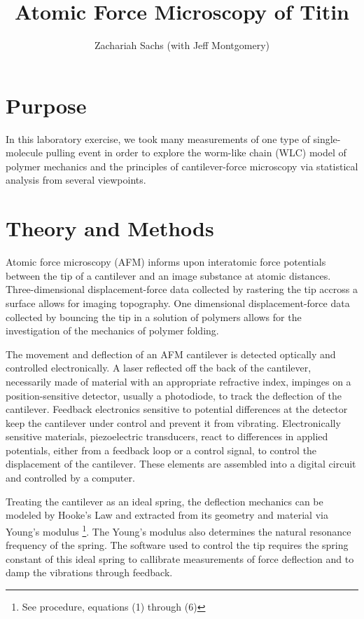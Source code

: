 \documentclass{article}
\title{Atomic Force Microscopy of Titin}
\author{Zachariah Sachs (with Jeff Montgomery)}
\begin{document}
\maketitle
\section{Purpose}

In this laboratory exercise, we took many measurements of one type of
single-molecule pulling event in order to explore the worm-like chain (WLC)
model of polymer mechanics and the principles of cantilever-force microscopy via statistical
analysis from several viewpoints.

\section{Theory and Methods}

Atomic force microscopy (AFM) informs upon interatomic force potentials 
between the tip of a cantilever and an image substance at atomic distances.
Three-dimensional displacement-force data collected by rastering the tip accross a surface
allows for imaging topography. One dimensional displacement-force data collected by 
bouncing the tip in a solution of polymers allows for the investigation of the mechanics
of polymer folding.

The movement and deflection of an AFM cantilever is detected optically and controlled
electronically. A laser reflected off the back of the cantilever,
necessarily made of material with an appropriate refractive index, impinges on a
position-sensitive detector, usually a photodiode, to track the deflection of the cantilever.
Feedback electronics sensitive to potential differences at the detector keep the cantilever
under control and prevent it from vibrating. Electronically sensitive materials, 
piezoelectric transducers, react to differences in applied potentials, either from a feedback
loop or a control signal, to control the displacement of the cantilever. These elements are
assembled into a digital circuit and controlled by a computer.

Treating the cantilever as an ideal spring, the deflection mechanics can be modeled by
Hooke's Law and extracted from its geometry and material via Young's modulus
\footnote{See procedure, equations (1) through (6)}. The
Young's modulus also determines the natural resonance frequency of the spring. The
software used to control the tip requires the spring constant of this ideal spring to
callibrate measurements of force deflection and to damp the vibrations through feedback.
\end{document}
